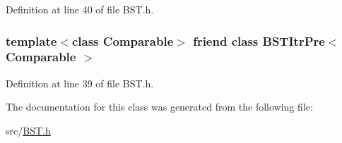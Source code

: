 Definition at line 40 of file B\-S\-T.\-h.

\hypertarget{class_binary_node_a45a55df6f11541416d4ea7684c575c1a}{
\subsubsection[{B\-S\-T\-Itr\-Pre$<$ Comparable $>$}]{\setlength{\rightskip}{0pt plus 5cm}template$<$class Comparable$>$ friend class {\bf B\-S\-T\-Itr\-Pre}$<$ Comparable $>$\hspace{0.3cm}{\ttfamily [friend]}}}\label{class_binary_node_a45a55df6f11541416d4ea7684c575c1a}


Definition at line 39 of file B\-S\-T.\-h.



The documentation for this class was generated from the following file\-:\begin{DoxyCompactItemize}
\item 
src/\hyperlink{_b_s_t_8h}{B\-S\-T.\-h}\end{DoxyCompactItemize}
